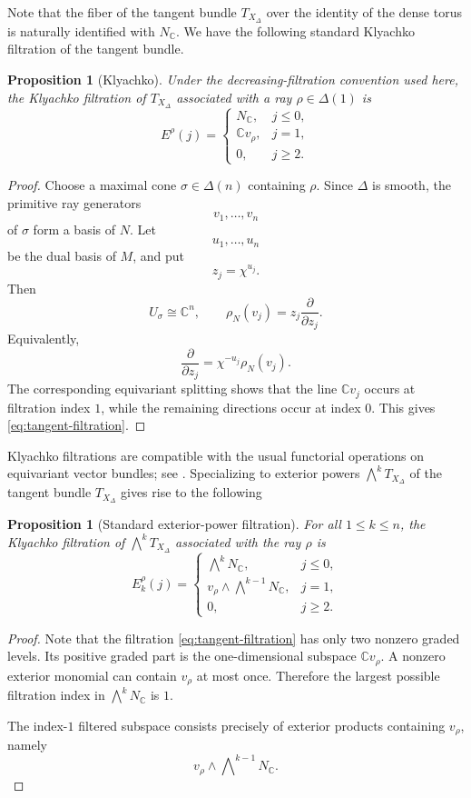 \documentclass[colorlinks,11pt,reqno]{amsart}
\newtheorem{proposition}[theorem]{Proposition}
\theoremstyle{definition}
\theoremstyle{remark}
\numberwithin{equation}{section}
\numberwithin{equation}{section}
\newcommand{\C}{\mathbb{C}}
\begin{document}
Note that the fiber of the tangent bundle $T_{X_{\Delta}}$ over the identity of the dense torus
is naturally identified with \(N_{\C}\). We have the following standard Klyachko filtration of the tangent bundle.
\begin{proposition}[Klyachko\cite{Klyachko}]\label{prop:tangent-filtration}
Under the decreasing-filtration convention used here, the Klyachko
filtration of \(T_{X_\Delta}\) associated with a ray \(\rho\in\Delta(1)\) is
\begin{equation}\label{eq:tangent-filtration}
E^\rho(j) =
\begin{cases}
N_{\C},&j\leq0,\\[2pt]
\C v_\rho,&j=1,\\[2pt]
0,&j\geq2.
\end{cases}
\end{equation}
\end{proposition}
\begin{proof}
Choose a maximal cone \(\sigma\in\Delta(n)\) containing \(\rho\). Since \(\Delta\) is smooth, the primitive ray generators
\[
v_1,\dots,v_n
\]
of \(\sigma\) form a basis of \(N\). Let
\[
u_1,\dots,u_n
\]
be the dual basis of \(M\), and put
\[
z_j=\chi^{u_j}.
\]
Then
\[
U_\sigma\cong\C^n, \qquad \rho_N(v_j) = z_j\frac{\partial}{\partial z_j}.
\]
Equivalently,
\[
\frac{\partial}{\partial z_j} = \chi^{-u_j}\rho_N(v_j).
\]
The corresponding equivariant splitting shows that the line \(\C v_j\) occurs at filtration index \(1\), while the remaining directions occur at index \(0\). This gives \eqref{eq:tangent-filtration}.
\end{proof}

Klyachko filtrations are compatible with the usual functorial operations on equivariant vector bundles; see \cites{Gonzalez,Klyachko}.
Specializing to exterior powers \(\bigwedge^kT_{X_\Delta}\) of the tangent bundle \(T_{X_\Delta}\) gives rise to the following
\begin{proposition}[Standard exterior-power filtration]\label{prop:exterior-filtration}
For all \(1\leq k\leq n\), the Klyachko filtration of \(\bigwedge^kT_{X_\Delta}\) associated with the ray \(\rho\) is
\[
E_k^\rho(j) =
\begin{cases}
\bigwedge^kN_{\C},&j\leq0,\\[4pt]
v_\rho\wedge\bigwedge^{k-1}N_{\C},&j=1,\\[4pt]
0,&j\geq2.
\end{cases}
\]
\end{proposition}
\begin{proof}
Note that the filtration \eqref{eq:tangent-filtration} has only two nonzero graded levels. Its positive graded part is the one-dimensional subspace \(\C v_\rho\). A nonzero exterior monomial can contain
\(v_\rho\) at most once. Therefore the largest possible filtration index in \(\bigwedge^kN_{\C}\) is \(1\).

The index-\(1\) filtered subspace consists precisely of exterior products containing \(v_\rho\), namely
\[
v_\rho\wedge\bigwedge\nolimits^{k-1}N_{\C}.
\]
\end{proof}
\end{document}
